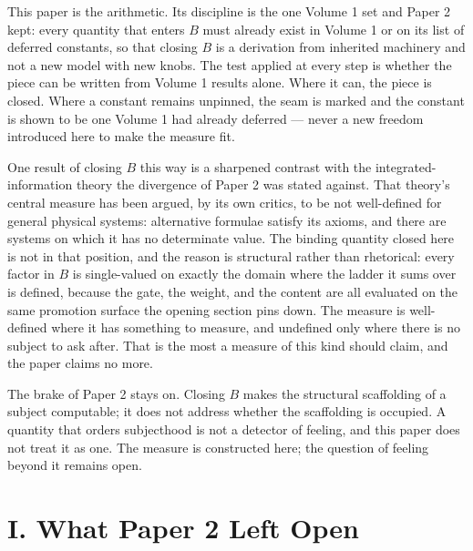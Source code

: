 \documentclass[11pt,oneside]{report}
\theoremstyle{definition}
\theoremstyle{remark}
\begin{document}
This paper is the arithmetic. Its discipline is the one Volume 1 set and
Paper 2 kept: every quantity that enters \ensuremath{B} must already exist in
Volume 1 or on its list of deferred constants, so that closing \ensuremath{B}
is a derivation from inherited machinery and not a new model with new knobs.
The test applied at every step is whether the piece can be written from
Volume 1 results alone. Where it can, the piece is closed. Where a constant
remains unpinned, the seam is marked and the constant is shown to be one
Volume 1 had already deferred --- never a new freedom introduced here to make
the measure fit.

One result of closing \ensuremath{B} this way is a sharpened contrast with
the integrated-information theory the divergence of Paper 2 was stated
against. That theory's central measure has been argued, by its own critics,
to be not well-defined for general physical systems: alternative formulae
satisfy its axioms, and there are systems on which it has no determinate
value. The binding quantity closed here is not in that position, and the
reason is structural rather than rhetorical: every factor in \ensuremath{B}
is single-valued on exactly the domain where the ladder it sums over is
defined, because the gate, the weight, and the content are all evaluated on
the same promotion surface the opening section pins down. The measure is
well-defined where it has something to measure, and undefined only where
there is no subject to ask after. That is the most a measure of this kind
should claim, and the paper claims no more.

The brake of Paper 2 stays on. Closing \ensuremath{B} makes the structural
scaffolding of a subject computable; it does not address whether the
scaffolding is occupied. A quantity that orders subjecthood is not a detector
of feeling, and this paper does not treat it as one. The measure is
constructed here; the question of feeling beyond it remains open.

\section*{I. What Paper 2 Left Open}
\end{document}
